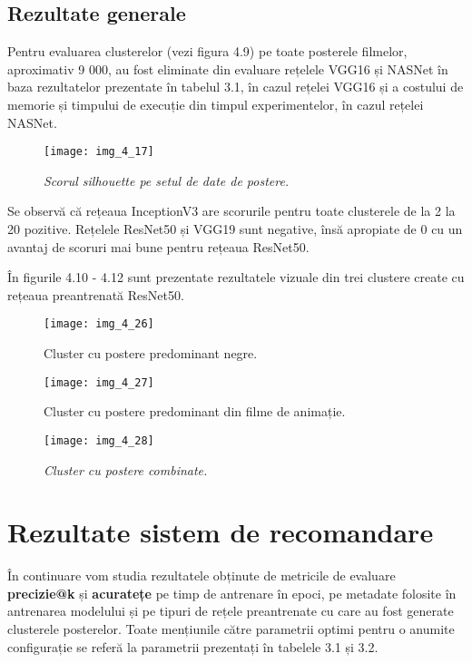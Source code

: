 \FloatBarrier
\subsection{Rezultate generale}
Pentru evaluarea clusterelor (vezi figura 4.9) pe toate posterele filmelor, aproximativ 9 000, au fost eliminate din evaluare rețelele VGG16 și NASNet în baza rezultatelor prezentate în tabelul 3.1, în cazul rețelei VGG16 și a costului de memorie și timpului de execuție din timpul experimentelor, în cazul rețelei NASNet.
\begin{figure}[!h]
	\centering
	\texttt{[image: img\_4\_17]}
	\caption[Scorul silhouette pe setul de date de postere]{\textit{Scorul silhouette pe setul de date de postere.}}
\end{figure} 
Se observă că rețeaua InceptionV3 are scorurile pentru toate clusterele de la 2 la 20 pozitive. Rețelele ResNet50 și VGG19 sunt negative, însă apropiate de 0 cu un avantaj de scoruri mai bune pentru rețeaua ResNet50.

În figurile 4.10 - 4.12 sunt prezentate rezultatele vizuale din trei clustere create cu rețeaua preantrenată ResNet50.
\begin{figure}[!h]
	\centering
	\texttt{[image: img\_4\_26]}
	\caption[Cluster cu postere predominant negre]{Cluster cu postere predominant negre.}
\end{figure} 
\begin{figure}[!h]
	\centering
	\texttt{[image: img\_4\_27]}
	\caption[Cluster cu postere predominant din filme de animație]{Cluster cu postere predominant din filme de animație.}
\end{figure} 
\begin{figure}[!h]
	\centering
	\texttt{[image: img\_4\_28]}
	\caption[Cluster cu postere combinate]{\textit{Cluster cu postere combinate.}}
\end{figure} 

\section{Rezultate sistem de recomandare}
În continuare vom studia rezultatele obținute de metricile de evaluare \textbf{precizie@k} și \textbf{acuratețe} pe timp de antrenare în epoci, pe metadate folosite în antrenarea modelului și pe tipuri de rețele preantrenate cu care au fost generate clusterele posterelor. Toate mențiunile către parametrii optimi pentru o anumite configurație se referă la parametrii prezentați în tabelele 3.1 și 3.2.

